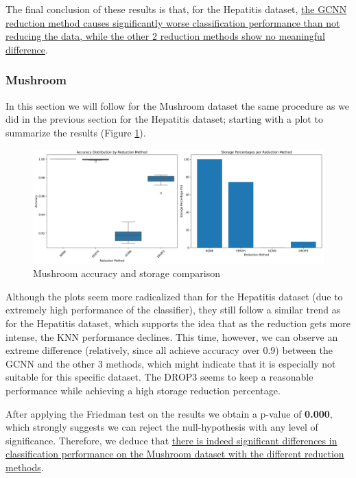 The final conclusion of these results is that, for the Hepatitis dataset, \uline{the GCNN reduction method causes significantly worse classification performance than not reducing the data, while the other 2 reduction methods show no meaningful difference}.

\subsubsection{Mushroom}
In this section we will follow for the Mushroom dataset the same procedure as we did in the previous section for the Hepatitis dataset; starting with a plot to summarize the results (Figure \ref{fig:mush:reduction}).
\begin{figure}[H]
    \centering
    \includegraphics[width=\textwidth]{figures/knn/mushroom/accuracy_storage_comparison.png}
    \caption{Mushroom accuracy and storage comparison}
    \label{fig:mush:reduction}
\end{figure}

Although the plots seem more radicalized than for the Hepatitis dataset (due to extremely high performance of the classifier), they still follow a similar trend as for the Hepatitis dataset, which supports the idea that as the reduction gets more intense, the KNN performance declines. This time, however, we can observe an extreme difference (relatively, since all achieve accuracy over 0.9) between the GCNN and the other 3 methods, which might indicate that it is especially not suitable for this specific dataset. The DROP3 seems to keep a reasonable performance while achieving a high storage reduction percentage.

After applying the Friedman test on the results we obtain a p-value of \textbf{0.000}, which strongly suggests we can reject the null-hypothesis with any level of significance. Therefore, we deduce that \uline{there is indeed significant differences in classification performance on the Mushroom dataset with the different reduction methods}.

